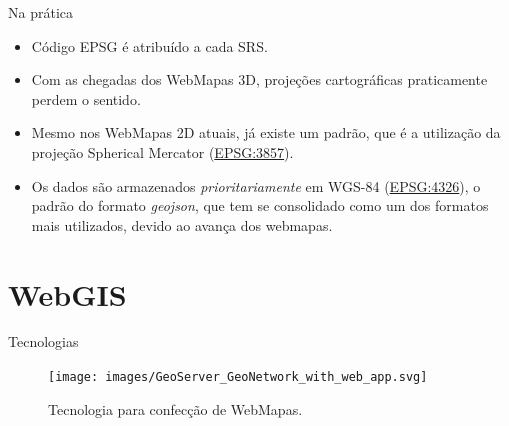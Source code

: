 \documentclass[9pt,ignorenonframetext,]{beamer}
\providecommand{\tightlist}{%
  \setlength{\itemsep}{0pt}\setlength{\parskip}{0pt}}
\begin{document}
\begin{frame}{Na prática}
\protect\hypertarget{na-pruxe1tica}{}

\begin{itemize}[<+->]
\tightlist
\item
  Código EPSG é atribuído a cada SRS.
\end{itemize}

\begin{itemize}[<+->]
\tightlist
\item
  Com as chegadas dos WebMapas 3D, projeções cartográficas praticamente
  perdem o sentido.
\end{itemize}

\begin{itemize}[<+->]
\tightlist
\item
  Mesmo nos WebMapas 2D atuais, já existe um padrão, que é a utilização
  da projeção Spherical Mercator
  (\href{http://epsg.io/3857}{EPSG:3857}).
\end{itemize}

\begin{itemize}[<+->]
\tightlist
\item
  Os dados são armazenados \emph{prioritariamente} em WGS-84
  (\href{http://epsg.io/4326}{EPSG:4326}), o padrão do formato
  \emph{geojson}, que tem se consolidado como um dos formatos mais
  utilizados, devido ao avança dos webmapas.
\end{itemize}

\end{frame}

\hypertarget{webgis}{%
\section{WebGIS}\label{webgis}}

\begin{frame}{Tecnologias}
\protect\hypertarget{tecnologias}{}

\begin{figure}[H]

{\centering \texttt{[image: images/GeoServer\_GeoNetwork\_with\_web\_app.svg]} 

}

\caption{Tecnologia para confecção de WebMapas.}\label{fig:unnamed-chunk-11}
\end{figure}

\end{frame}
\end{document}
